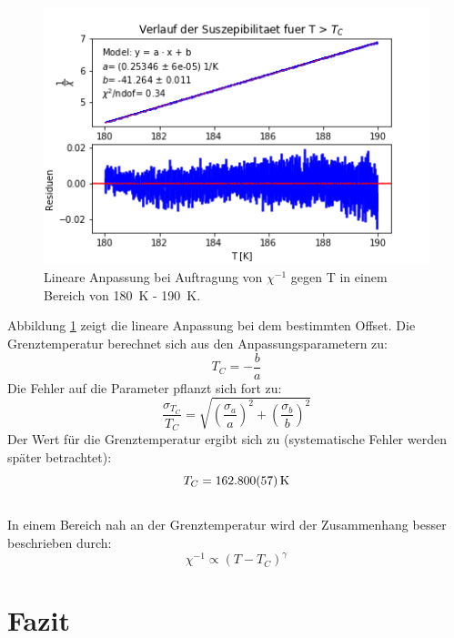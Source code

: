 \documentclass[12pt,a4paper]{article}
\begin{document}
\begin{figure}
\centering
\includegraphics[scale=1]{Bilder/Haupt_Probe/CurieWeiss.png}
\caption[test]{Lineare Anpassung bei Auftragung von $\chi ^{-1}$ gegen T in einem Bereich von \SI{180}{K} - \SI{190}{K}.}
\label{fig:CurieWeiss}
\end{figure}

Abbildung \ref{fig:CurieWeiss} zeigt die lineare Anpassung bei dem bestimmten Offset. Die Grenztemperatur berechnet sich aus den Anpassungsparametern zu:
\begin{equation*}
T_C = -\dfrac{b}{a}
\end{equation*}
Die Fehler auf die Parameter pflanzt sich fort zu:
\begin{equation*}
\dfrac{\sigma _{T_C}}{T_C} = \sqrt{\left( \dfrac{\sigma _a}{a} \right)^2 + \left( \dfrac{\sigma _b}{b} \right)^2}
\end{equation*}
Der Wert für die Grenztemperatur ergibt sich zu (systematische Fehler werden später betrachtet):
\begin{equation*}
T_C = \SI{162,800 \pm 0,057}{K}
\end{equation*}\\
In einem Bereich nah an der Grenztemperatur wird der Zusammenhang besser beschrieben durch:
\begin{equation*}
\chi ^{-1} \propto (T - T_C)^\gamma
\end{equation*}

\section{Fazit}
\end{document}
